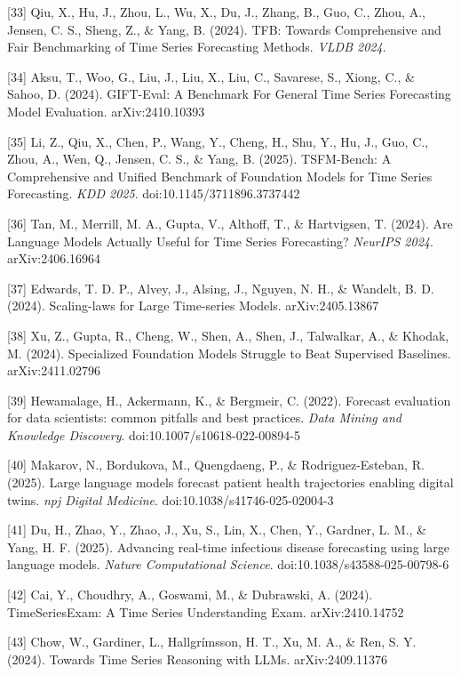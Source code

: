 {[}33{]} Qiu, X., Hu, J., Zhou, L., Wu, X., Du, J., Zhang, B., Guo, C., Zhou, A., Jensen, C. S., Sheng, Z., \& Yang, B. (2024). TFB: Towards Comprehensive and Fair Benchmarking of Time Series Forecasting Methods. \emph{VLDB 2024}.

{[}34{]} Aksu, T., Woo, G., Liu, J., Liu, X., Liu, C., Savarese, S., Xiong, C., \& Sahoo, D. (2024). GIFT-Eval: A Benchmark For General Time Series Forecasting Model Evaluation. arXiv:2410.10393

{[}35{]} Li, Z., Qiu, X., Chen, P., Wang, Y., Cheng, H., Shu, Y., Hu, J., Guo, C., Zhou, A., Wen, Q., Jensen, C. S., \& Yang, B. (2025). TSFM-Bench: A Comprehensive and Unified Benchmark of Foundation Models for Time Series Forecasting. \emph{KDD 2025}. doi:10.1145/3711896.3737442

{[}36{]} Tan, M., Merrill, M. A., Gupta, V., Althoff, T., \& Hartvigsen, T. (2024). Are Language Models Actually Useful for Time Series Forecasting? \emph{NeurIPS 2024}. arXiv:2406.16964

{[}37{]} Edwards, T. D. P., Alvey, J., Alsing, J., Nguyen, N. H., \& Wandelt, B. D. (2024). Scaling-laws for Large Time-series Models. arXiv:2405.13867

{[}38{]} Xu, Z., Gupta, R., Cheng, W., Shen, A., Shen, J., Talwalkar, A., \& Khodak, M. (2024). Specialized Foundation Models Struggle to Beat Supervised Baselines. arXiv:2411.02796

{[}39{]} Hewamalage, H., Ackermann, K., \& Bergmeir, C. (2022). Forecast evaluation for data scientists: common pitfalls and best practices. \emph{Data Mining and Knowledge Discovery}. doi:10.1007/s10618-022-00894-5

{[}40{]} Makarov, N., Bordukova, M., Quengdaeng, P., \& Rodriguez-Esteban, R. (2025). Large language models forecast patient health trajectories enabling digital twins. \emph{npj Digital Medicine}. doi:10.1038/s41746-025-02004-3

{[}41{]} Du, H., Zhao, Y., Zhao, J., Xu, S., Lin, X., Chen, Y., Gardner, L. M., \& Yang, H. F. (2025). Advancing real-time infectious disease forecasting using large language models. \emph{Nature Computational Science}. doi:10.1038/s43588-025-00798-6

{[}42{]} Cai, Y., Choudhry, A., Goswami, M., \& Dubrawski, A. (2024). TimeSeriesExam: A Time Series Understanding Exam. arXiv:2410.14752

{[}43{]} Chow, W., Gardiner, L., Hallgrímsson, H. T., Xu, M. A., \& Ren, S. Y. (2024). Towards Time Series Reasoning with LLMs. arXiv:2409.11376

